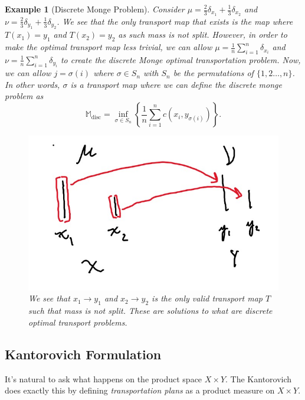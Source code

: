 \documentclass[12pt]{article}
\theoremstyle{plain}
\newtheorem{exmp}{Example}[section]
\numberwithin{equation}{section}
\begin{document}
\begin{exmp}[Discrete Monge Problem]\label{exmp:monge}
Consider $\mu = \frac{2}{3}\delta_{x_1} + \frac{1}{3}\delta_{x_2}$ and $\nu = \frac{2}{3}\delta_{y_1} + \frac{1}{3}\delta_{y_2}$. We see that the only transport map that exists is the map where $T(x_1) = y_1$ and $T(x_2)=y_2$ as such mass is not split.
However, in order to make the optimal transport map less trivial, we can allow $\mu = \frac{1}{n}\sum_{i=1}^n\delta_{x_i}$ and $\nu = \frac{1}{n}\sum_{i=1}^n\delta_{y_i}$ to create the discrete Monge optimal transportation problem. \newline
Now, we can allow $j = \sigma(i)$ where $\sigma \in S_n$ with $S_n$ be the permutations of $\{1,2\dots,n\}$. In other words, $\sigma$ is a transport map where we can define the discrete monge problem as 
\[\mathbb{M}_{\text{disc}} = \inf_{\sigma\in S_n}\left\{\frac{1}{n}\sum_{i=1}^nc(x_i,y_{\sigma(i)})\right\}.\]
\begin{figure}[H]
  \center
  \includegraphics[scale=0.3]{monge.jpg}
  \caption{We see that $x_1\to y_1$ and $x_2\to y_2$ is the only valid transport map $T$ such that mass is not split. These are solutions to what are discrete optimal transport problems.}
  \label{fig:monge}
\end{figure}
\end{exmp}
\subsection{Kantorovich Formulation}
It's natural to ask what happens on the product space $X\times Y$. The Kantorovich does exactly this by defining \textit{transportation plans} as a product measure on $X\times Y$.
\end{document}
